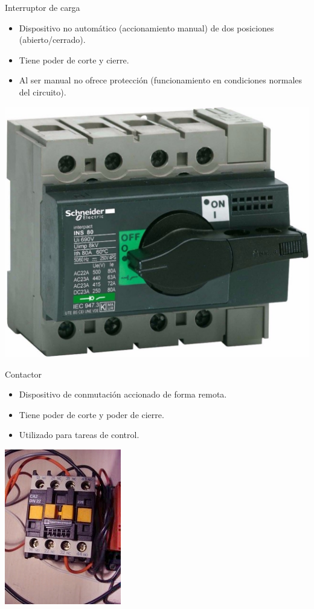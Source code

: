 \documentclass[xcolor={usenames,svgnames,dvipsnames}]{beamer}
\begin{document}
\begin{frame}[label={sec:org1306b3a}]{Interruptor de carga}
\begin{itemize}
\item Dispositivo no automático (\alert{accionamiento manual}) de dos posiciones (abierto/cerrado).

\item Tiene \alert{poder de corte y cierre}.

\item Al ser manual \alert{no ofrece protección} (funcionamiento en condiciones normales del circuito).
\end{itemize}
\begin{center}
\includegraphics[height=0.6\textheight]{../figs/interruptor_manual.jpg}
\end{center}
\end{frame}


\begin{frame}[label={sec:orgcba5d28}]{Contactor}
\begin{itemize}
\item Dispositivo de conmutación accionado de forma remota.
\item Tiene poder de corte y poder de cierre.
\item Utilizado para tareas de control.
\end{itemize}

\begin{center}
\includegraphics[height=0.6\textheight]{../figs/Contactor.jpg}
\end{center}
\end{frame}
\end{document}
